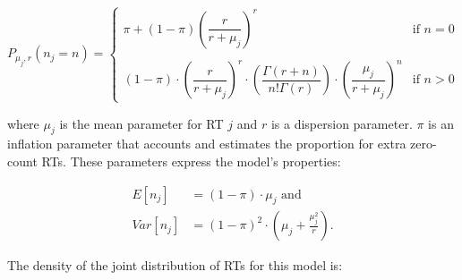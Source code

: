 \documentclass[11pt]{article}
\begin{document}
  \[P_{\mu_j, r}(n_j=n)=
    \begin{cases}
      \pi+(1-\pi)\left(\dfrac{r}{r+\mu_j}\right)^r& \text{if } n=0\\
      &\\
      (1-\pi)\cdot\left(\dfrac{r}{r+\mu_j}\right)^r \cdot \left(\dfrac{\Gamma(r+n)}{n!\Gamma(r)}\right) \cdot \left(\dfrac{\mu_j}{r+\mu_j}\right)^n &  \text{if } n>0
    \end{cases}
  \]

\noindent where $\mu_j$ is the mean parameter for RT $j$ and $r$ is a dispersion parameter. $\pi$ is an inflation parameter that accounts and estimates the proportion for extra zero-count RTs. These parameters express the model's properties:  

\begin{equation} 
    \begin{split} 
      E[n_j]&=(1-\pi)\cdot \mu_j \text{ and }\\
      Var[n_j]&=(1-\pi)^2\cdot\left(\mu_j+\frac{\mu_j^2}{r}\right) .
\label{ZINB_moms}
    \end{split}
\end{equation} 

The density of the joint distribution of RTs for this model is:
\end{document}
